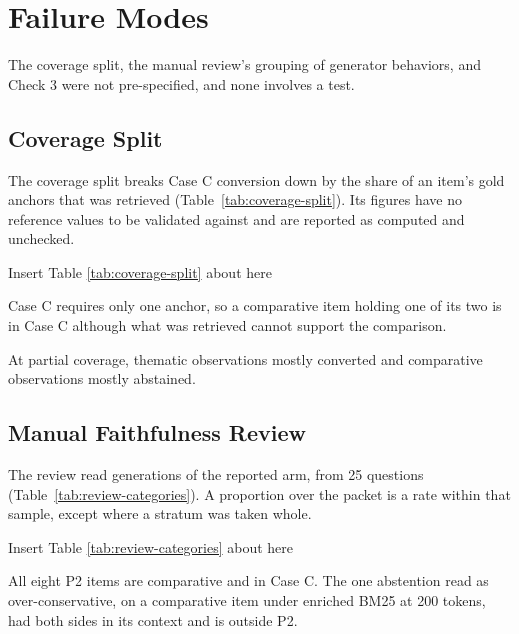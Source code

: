 \section{Failure Modes}

The coverage split, the manual review's grouping of generator behaviors, and
Check 3 were not pre-specified, and none involves a test.

\subsection{Coverage Split}

The coverage split breaks Case C conversion down by the share of an item's gold
anchors that was retrieved (Table~\ref{tab:coverage-split}). Its figures have
no reference values to be validated against and are reported as computed and
unchecked.

{\centering\noindent Insert Table \ref{tab:coverage-split} about here\par}

Case C requires only one anchor, so a comparative item holding one of its two
is in Case C although what was retrieved cannot support the comparison.

At partial coverage, thematic observations mostly converted and comparative
observations mostly abstained.

\subsection{Manual Faithfulness Review}

The review read \thesisNumReviewItems{} generations of the reported arm, from 25
questions (Table~\ref{tab:review-categories}). A proportion over the packet is a
rate within that sample, except where a stratum was taken whole.

{\centering\noindent Insert Table \ref{tab:review-categories} about here\par}

All eight P2 items are comparative and in Case C. The one abstention read as
over-conservative, on a comparative item under enriched BM25 at 200 tokens, had
both sides in its context and is outside P2.

